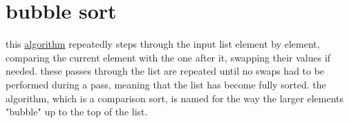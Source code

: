 \documentclass[a4paper,12pt]{article}
\begin{document}
\section{bubble sort}
\label{sec:org37fc68d}
this \href{20220706211958-algorithm.org}{algorithm} repeatedly steps through the input list element by element, comparing the current element with the one after it, swapping their values if needed. these passes through the list are repeated until no swaps had to be performed during a pass, meaning that the list has become fully sorted. the algorithm, which is a comparison sort, is named for the way the larger elements "bubble" up to the top of the list.\\

\\
\end{document}
